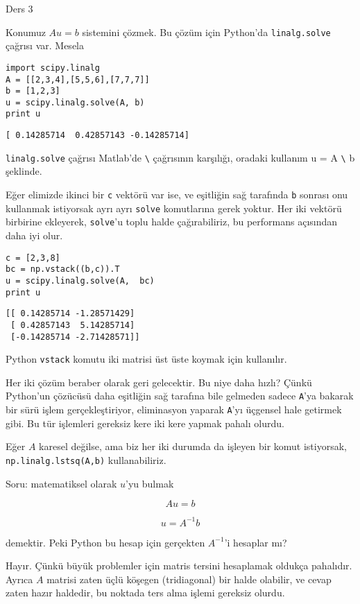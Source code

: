 \documentclass[12pt,fleqn]{article}\usepackage{../../common}
\begin{document}
Ders 3

Konumuz $Au = b$ sistemini çözmek. Bu çözüm için Python'da
\verb!linalg.solve! çağrısı var. Mesela

\begin{verbatim}
import scipy.linalg
A = [[2,3,4],[5,5,6],[7,7,7]]
b = [1,2,3]
u = scipy.linalg.solve(A, b)
print u
\end{verbatim}

\begin{verbatim}
[ 0.14285714  0.42857143 -0.14285714]
\end{verbatim}

\verb!linalg.solve! çağrısı Matlab'de \verb!\! çağrısının karşılığı,
oradaki kullanım u = A \verb!\! b şeklinde. 

Eğer elimizde ikinci bir \verb!c! vektörü var ise, ve eşitliğin sağ
tarafında \verb!b! sonrası onu kullanmak istiyorsak ayrı ayrı \verb!solve!
komutlarına gerek yoktur. Her iki vektörü birbirine ekleyerek,
\verb!solve!'u toplu halde çağırabiliriz, bu performans açısından daha iyi
olur. 

\begin{verbatim}
c = [2,3,8]
bc = np.vstack((b,c)).T
u = scipy.linalg.solve(A,  bc)
print u
\end{verbatim}

\begin{verbatim}
[[ 0.14285714 -1.28571429]
 [ 0.42857143  5.14285714]
 [-0.14285714 -2.71428571]]
\end{verbatim}

Python \verb!vstack! komutu iki matrisi üst üste koymak için kullanılır.

Her iki çözüm beraber olarak geri gelecektir. Bu niye daha hızlı? Çünkü
Python'un çözücüsü daha eşitliğin sağ tarafına bile gelmeden sadece
\verb!A!'ya bakarak bir sürü işlem gerçekleştiriyor, eliminasyon yaparak
\verb!A!'yı üçgensel hale getirmek gibi. Bu tür işlemleri gereksiz kere iki
kere yapmak pahalı olurdu.

Eğer $A$ karesel değilse, ama biz her iki durumda da işleyen bir komut
istiyorsak, \verb!np.linalg.lstsq(A,b)! kullanabiliriz. 

Soru: matematiksel olarak $u$'yu bulmak 

$$ Au = b $$

$$ u = A^{-1}b $$

demektir. Peki Python bu hesap için gerçekten $A^{-1}$'i hesaplar mı?

Hayır. Çünkü büyük problemler için matris tersini hesaplamak oldukça
pahalıdır. Ayrıca $A$ matrisi zaten üçlü köşegen (tridiagonal) bir halde
olabilir, ve cevap zaten hazır haldedir, bu noktada ters alma işlemi
gereksiz olurdu. 
\end{document}

